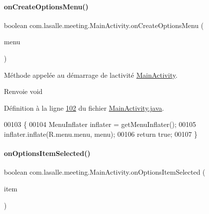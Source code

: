\paragraph{\texorpdfstring{on\+Create\+Options\+Menu()}{onCreateOptionsMenu()}}
{\footnotesize\ttfamily boolean com.\+lasalle.\+meeting.\+Main\+Activity.\+on\+Create\+Options\+Menu (\begin{DoxyParamCaption}\item[{Menu}]{menu }\end{DoxyParamCaption})}



Méthode appelée au démarrage de l\textquotesingle{}activité \hyperlink{classcom_1_1lasalle_1_1meeting_1_1_main_activity}{Main\+Activity}. 

\begin{DoxyReturn}{Renvoie}
void 
\end{DoxyReturn}


Définition à la ligne \hyperlink{_main_activity_8java_source_l00102}{102} du fichier \hyperlink{_main_activity_8java_source}{Main\+Activity.\+java}.


\begin{DoxyCode}
00103     \{
00104         MenuInflater inflater = getMenuInflater();
00105         inflater.inflate(R.menu.menu, menu);
00106         \textcolor{keywordflow}{return} \textcolor{keyword}{true};
00107     \}
\end{DoxyCode}
\mbox{\label{classcom_1_1lasalle_1_1meeting_1_1_main_activity_aa75ab3607c240fd26857f7eb6314e8bb}} 
\paragraph{\texorpdfstring{on\+Options\+Item\+Selected()}{onOptionsItemSelected()}}
{\footnotesize\ttfamily boolean com.\+lasalle.\+meeting.\+Main\+Activity.\+on\+Options\+Item\+Selected (\begin{DoxyParamCaption}\item[{Menu\+Item}]{item }\end{DoxyParamCaption})}



